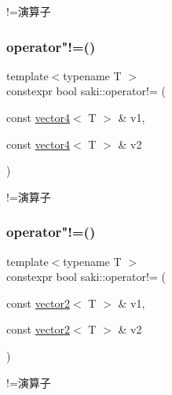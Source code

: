 !=演算子 

\mbox{\label{namespacesaki_a6805502ef12cd12f6be61a958fd35aa7}} 
\subsubsection{\texorpdfstring{operator"!=()}{operator!=()}\hspace{0.1cm}{\footnotesize\ttfamily [4/11]}}
{\footnotesize\ttfamily template$<$typename T $>$ \\
constexpr bool saki\+::operator!= (\begin{DoxyParamCaption}\item[{const \mbox{\hyperlink{classsaki_1_1vector4}{vector4}}$<$ T $>$ \&}]{v1,  }\item[{const \mbox{\hyperlink{classsaki_1_1vector4}{vector4}}$<$ T $>$ \&}]{v2 }\end{DoxyParamCaption})}



!=演算子 

\mbox{\label{namespacesaki_ac0c806d3237b6718e95e9b71f838bcc1}} 
\subsubsection{\texorpdfstring{operator"!=()}{operator!=()}\hspace{0.1cm}{\footnotesize\ttfamily [5/11]}}
{\footnotesize\ttfamily template$<$typename T $>$ \\
constexpr bool saki\+::operator!= (\begin{DoxyParamCaption}\item[{const \mbox{\hyperlink{classsaki_1_1vector2}{vector2}}$<$ T $>$ \&}]{v1,  }\item[{const \mbox{\hyperlink{classsaki_1_1vector2}{vector2}}$<$ T $>$ \&}]{v2 }\end{DoxyParamCaption})}



!=演算子 

\mbox{\label{namespacesaki_a8c33f5cbcafab48779b77c324716fed9}} 
